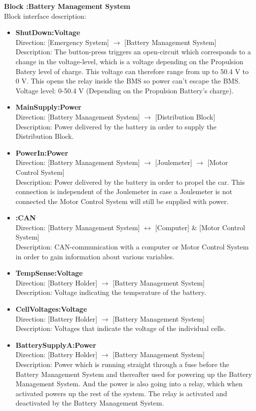 \textbf{Block :Battery Management System}\\
Block interface description:
\begin{itemize}
	\item \textbf{ShutDown:Voltage}\\
	Direction: [Emergency System] $\rightarrow$ [Battery Management System]\\
	Description: The button-press triggers an open-circuit which corresponds to a change in the voltage-level, which is a voltage depending on the Propulsion Batery level of charge. This voltage can therefore range from up to 50.4 V to 0 V. This opens the relay inside the BMS so power can't escape the BMS.\\
	Voltage level: 0-50.4 V (Depending on the Propulsion Battery's charge).
	\item \textbf{MainSupply:Power}\\
	Direction: [Battery Management System] $\rightarrow$ [Distribution Block]\\
	Description: Power delivered by the battery in order to supply the Distribution Block.
	\item \textbf{PowerIn:Power}\\
	Direction: [Battery Management System] $\rightarrow$ [Joulemeter] $\rightarrow$ [Motor Control System]\\
	Description: Power delivered by the battery in order to propel the car. This connection is independent of the Joulemeter in case a Joulemeter is not connected the Motor Control System will still be supplied with power.
	\item \textbf{:CAN}\\
	Direction: [Battery Management System] $\leftrightarrow$ [Computer] \& [Motor Control System]\\
	Description: CAN-communication with a computer or Motor Control System in order to gain information about various variables.
	\item \textbf{TempSense:Voltage}\\
	Direction: [Battery Holder] $\rightarrow$ [Battery Management System]\\
	Description: Voltage indicating the temperature of the battery.
	\item \textbf{CellVoltages:Voltage}\\
	Direction: [Battery Holder] $\rightarrow$ [Battery Management System]\\
	Description: Voltages that indicate the voltage of the individual cells.
	\item \textbf{BatterySupplyA:Power}\\
	Direction: [Battery Holder] $\rightarrow$ [Battery Management System]\\
	Description: Power which is running straight through a fuse before the Battery Management System and thereafter used for powering up the Battery Management System. And the power is also going into a relay, which when activated powers up the rest of the system. The relay is activated and deactivated by the Battery Management System.
	
\end{itemize}

